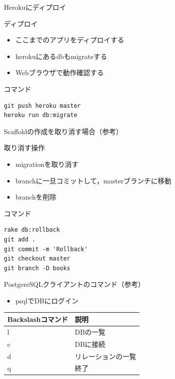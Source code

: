 \documentclass[t, aspectratio=169]{beamer}
\begin{document}
\begin{frame}[fragile,label=sec-7-1-7]{Herokuにディプロイ}
 \begin{block}{ディプロイ}
\begin{itemize}
\item ここまでのアプリをディプロイする
\item herokuにあるdbもmigrateする
\item Webブラウザで動作確認する
\end{itemize}
\end{block}
\begin{block}{コマンド}
\begin{verbatim}
git push heroku master
heroku run db:migrate
\end{verbatim}
\end{block}
\end{frame}

\begin{frame}[fragile,label=sec-7-1-8]{Scaffoldの作成を取り消す場合（参考）}
 \begin{block}{取り消す操作}
\begin{itemize}
\item migrationを取り消す
\item branchに一旦コミットして，masterブランチに移動
\item branchを削除
\end{itemize}
\end{block}
\begin{block}{コマンド}
\begin{verbatim}
rake db:rollback
git add .
git commit -m 'Rollback'
git checkout master
git branch -D books
\end{verbatim}
\end{block}
\end{frame}

\begin{frame}[label=sec-7-1-9]{PostgereSQLクライアントのコマンド（参考）}
\begin{itemize}
\item psqlでDBにログイン
\end{itemize}

\begin{center}
\begin{tabular}{ll}
Backslashコマンド & 説明\\
\hline
l & DBの一覧\\
c & DBに接続\\
d & リレーションの一覧\\
q & 終了\\
\end{tabular}
\end{center}
\end{frame}
\end{document}
